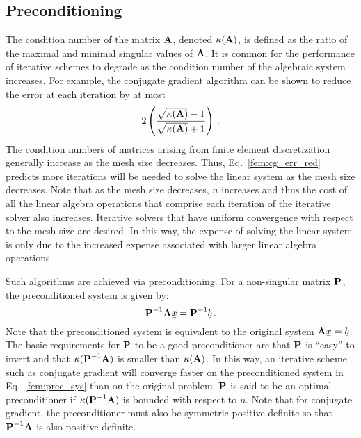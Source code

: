 \documentclass[../doc.tex]{subfiles}
\begin{document}
\subsection{Preconditioning}
The condition number of the matrix $\boldsymbol{\mathrm{A}}$, denoted $\kappa(\boldsymbol{\mathrm{A}})$, is defined as the ratio of the maximal and minimal singular values of $\boldsymbol{\mathrm{A}}$. 
It is common for the performance of iterative schemes to degrade as the condition number of the algebraic system increases. 
For example, the conjugate gradient algorithm can be shown to reduce the error at each iteration by at most 
	\begin{equation} \label{fem:cg_err_red}
		2\left( \frac{\sqrt{\kappa(\boldsymbol{\mathrm{A}})} - 1}{\sqrt{\kappa(\boldsymbol{\mathrm{A}})} + 1} \right) \,. 
	\end{equation}
The condition numbers of matrices arising from finite element discretization generally increase as the mesh size decreases. Thus, Eq.~\ref{fem:cg_err_red} predicts more iterations will be needed to solve the linear system as the mesh size decreases. Note that as the mesh size decreases, $n$ increases and thus the cost of all the linear algebra operations that comprise each iteration of the iterative solver also increases. 
Iterative solvers that have uniform convergence with respect to the mesh size are desired. In this way, the expense of solving the linear system is only due to the increased expense associated with larger linear algebra operations. 

Such algorithms are achieved via preconditioning. For a non-singular matrix $\boldsymbol{\mathrm{P}}$, the preconditioned system is given by: 
	\begin{equation} \label{fem:prec_sys}
		\mat{P}^{-1} \mat{A} \ubar{x} = \mat{P}^{-1} \ubar{b} \,.
	\end{equation}
Note that the preconditioned system is equivalent to the original system $\mat{A}\ubar{x} = \ubar{b}$. The basic requirements for $\boldsymbol{\mathrm{P}}$ to be a good preconditioner are that $\boldsymbol{\mathrm{P}}$ is ``easy'' to invert and that $\kappa(\boldsymbol{\mathrm{P}}^{-1}\boldsymbol{\mathrm{A}})$ is smaller than $\kappa(\boldsymbol{\mathrm{A}})$. In this way, an iterative scheme such as conjugate gradient will converge faster on the preconditioned system in Eq.~\ref{fem:prec_sys} than on the original problem. $\boldsymbol{\mathrm{P}}$ is said to be an optimal preconditioner if $\kappa(\boldsymbol{\mathrm{P}}^{-1}\boldsymbol{\mathrm{A}})$ is bounded with respect to $n$. Note that for conjugate gradient, the preconditioner must also be symmetric positive definite so that $\boldsymbol{\mathrm{P}}^{-1}\boldsymbol{\mathrm{A}}$ is also positive definite. 
\end{document}
